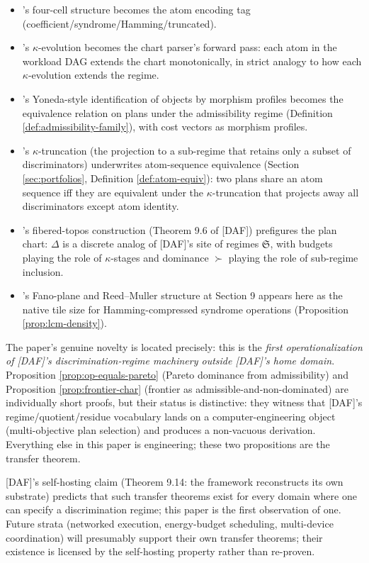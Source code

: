 \begin{itemize}[nosep]
  \item [DAF]'s four-cell structure becomes the atom encoding
    tag (coefficient/syndrome/Hamming/truncated).
  \item [DAF]'s $\kappa$-evolution becomes the chart parser's
    forward pass: each atom in the workload DAG extends the
    chart monotonically, in strict analogy to how each
    $\kappa$-evolution extends the regime.
  \item [DAF]'s Yoneda-style identification of objects by
    morphism profiles becomes the equivalence relation on
    plans under the admissibility regime
    (Definition \ref{def:admissibility-family}), with cost
    vectors as morphism profiles.
  \item [DAF]'s $\kappa$-truncation (the projection to a
    sub-regime that retains only a subset of discriminators)
    underwrites atom-sequence equivalence
    (Section \ref{sec:portfolios}, Definition
    \ref{def:atom-equiv}): two plans share an atom sequence
    iff they are equivalent under the $\kappa$-truncation that
    projects away all discriminators except atom identity.
  \item [DAF]'s fibered-topos construction (Theorem 9.6 of [DAF])
    prefigures the plan chart: $\Delta$ is a discrete analog of
    [DAF]'s site of regimes $\mathfrak{S}$, with budgets
    playing the role of $\kappa$-stages and dominance
    $\succ$ playing the role of sub-regime inclusion.
  \item [DAF]'s Fano-plane and Reed--Muller structure at
    Section 9 appears here as the native tile size for
    Hamming-compressed syndrome operations
    (Proposition \ref{prop:lcm-density}).
\end{itemize}

The paper's genuine novelty is located precisely: this is the
\emph{first operationalization of [DAF]'s discrimination-regime
machinery outside [DAF]'s home domain}. Proposition
\ref{prop:op-equals-pareto} (Pareto dominance from admissibility)
and Proposition \ref{prop:frontier-char} (frontier as
admissible-and-non-dominated) are individually short proofs, but
their status is distinctive: they witness that [DAF]'s
regime/quotient/residue vocabulary lands on a computer-engineering
object (multi-objective plan selection) and produces a
non-vacuous derivation. Everything else in this paper is
engineering; these two propositions are the transfer theorem.

[DAF]'s self-hosting claim (Theorem 9.14: the framework
reconstructs its own substrate) predicts that such transfer
theorems exist for every domain where one can specify a
discrimination regime; this paper is the first observation of
one. Future strata (networked execution, energy-budget
scheduling, multi-device coordination) will presumably support
their own transfer theorems; their existence is licensed by the
self-hosting property rather than re-proven.

